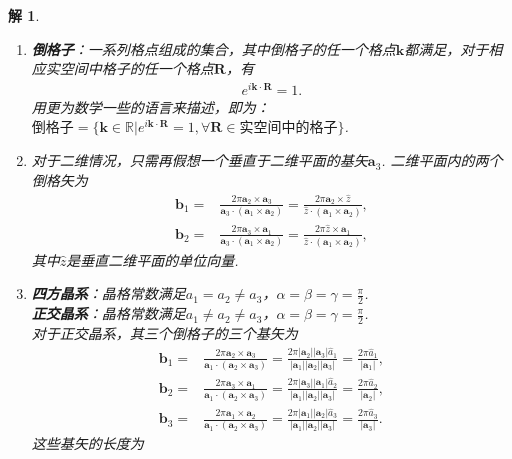 \documentclass[UTF8,10pt,a4paper]{article}
\theoremstyle{Problem}
\theoremstyle{Solution}
\newtheorem*{sol}{解}
\providecommand{\abs}[1]{\left\lvert#1\right\rvert}
\begin{document}
\begin{sol}
    \begin{enumerate}
        \item[(a)] \textbf{倒格子}：一系列格点组成的集合，其中倒格子的任一个格点$\bm{k}$都满足，对于相应实空间中格子的任一个格点$\bm{R}$，有
        \begin{align}
            e^{i\bm{k}\cdot\bm{R}}=1.
        \end{align}
        用更为数学一些的语言来描述，即为：$\textbf{倒格子}=\{\bm{k}\in\mathbb{R}\vert e^{i\bm{k}\cdot\bm{R}}=1,\forall\bm{R}\in\textbf{实空间中的格子}\}$.
        \item[(b)] 对于二维情况，只需再假想一个垂直于二维平面的基矢$\bm{a}_3$. 二维平面内的两个倒格矢为
        \begin{align*}
            \bm{b}_1=&\frac{2\pi\bm{a}_2\times\bm{a}_3}{\bm{a}_3\cdot(\bm{a}_1\times\bm{a}_2)}=\frac{2\pi\bm{a}_2\times\hat{z}}{\hat{z}\cdot(\bm{a}_1\times\bm{a}_2)},\\
            \bm{b}_2=&\frac{2\pi\bm{a}_3\times\bm{a}_1}{\bm{a}_3\cdot(\bm{a}_1\times\bm{a}_2)}=\frac{2\pi\hat{z}\times\bm{a}_1}{\hat{z}\cdot(\bm{a}_1\times\bm{a}_2)},
        \end{align*}
        其中$\hat{z}$是垂直二维平面的单位向量.
        \item[(c)] \textbf{四方晶系}：晶格常数满足$a_1=a_2\neq a_3$，$\alpha=\beta=\gamma=\frac{\pi}{2}$.\\
        \textbf{正交晶系}：晶格常数满足$a_1\neq a_2\neq a_3$，$\alpha=\beta=\gamma=\frac{\pi}{2}$.\\
        对于正交晶系，其三个倒格子的三个基矢为
        \begin{align*}
            \bm{b}_1=&\frac{2\pi\bm{a}_2\times\bm{a}_3}{\bm{a}_1\cdot(\bm{a}_2\times\bm{a}_3)}=\frac{2\pi\abs{\bm{a}_2}\abs{\bm{a}_3}\hat{a}_1}{\abs{\bm{a}_1}\abs{\bm{a}_2}\abs{\bm{a}_3}}=\frac{2\pi\hat{a}_1}{\abs{\bm{a}_1}},\\
            \bm{b}_2=&\frac{2\pi\bm{a}_3\times\bm{a}_1}{\bm{a}_1\cdot(\bm{a}_2\times\bm{a}_3)}=\frac{2\pi\abs{\bm{a}_3}\abs{\bm{a}_1}\hat{a}_2}{\abs{\bm{a}_1}\abs{\bm{a}_2}\abs{\bm{a}_3}}=\frac{2\pi\hat{a}_2}{\abs{\bm{a}_2}},\\
            \bm{b}_3=&\frac{2\pi\bm{a}_1\times\bm{a}_2}{\bm{a}_1\cdot(\bm{a}_2\times\bm{a}_3)}=\frac{2\pi\abs{\bm{a}_1}\abs{\bm{a}_2}\hat{a}_3}{\abs{\bm{a}_1}\abs{\bm{a}_2}\abs{\bm{a}_3}}=\frac{2\pi\hat{a}_3}{\abs{\bm{a}_3}}.
        \end{align*}
        这些基矢的长度为
        \begin{align*}

\end{align*}
\end{enumerate}
\end{sol}
\end{document}
